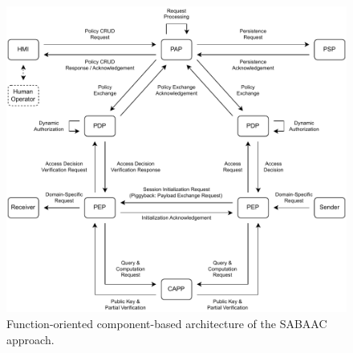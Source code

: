 \begin{figure}
    \centering
    \includegraphics[width=1.0\linewidth]{figures/SABAAC_protocols_overview.drawio.pdf}
    \caption{Function-oriented component-based architecture of the SABAAC approach.}
    \label{fig:sabaac_protocols_overview}
\end{figure}

